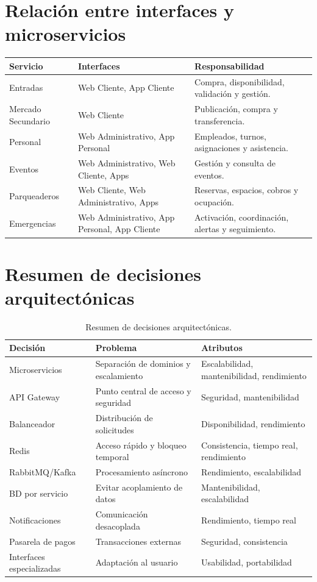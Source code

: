 \documentclass[12pt,a4paper]{article}
\begin{document}
\section{Relación entre interfaces y microservicios}

\begin{longtable}{p{4cm}p{4cm}p{6cm}}
\toprule
\textbf{Servicio} & \textbf{Interfaces} & \textbf{Responsabilidad}\\
\midrule
Entradas & Web Cliente, App Cliente & Compra, disponibilidad, validación y gestión.\\
Mercado Secundario & Web Cliente & Publicación, compra y transferencia.\\
Personal & Web Administrativo, App Personal & Empleados, turnos, asignaciones y asistencia.\\
Eventos & Web Administrativo, Web Cliente, Apps & Gestión y consulta de eventos.\\
Parqueaderos & Web Cliente, Web Administrativo, Apps & Reservas, espacios, cobros y ocupación.\\
Emergencias & Web Administrativo, App Personal, App Cliente & Activación, coordinación, alertas y seguimiento.\\
\bottomrule
\end{longtable}

\section{Resumen de decisiones arquitectónicas}

\begin{table}[H]
\centering
\small
\begin{tabular}{p{4cm}p{5cm}p{5cm}}
\toprule
\textbf{Decisión} & \textbf{Problema} & \textbf{Atributos}\\
\midrule
Microservicios & Separación de dominios y escalamiento & Escalabilidad, mantenibilidad, rendimiento\\
API Gateway & Punto central de acceso y seguridad & Seguridad, mantenibilidad\\
Balanceador & Distribución de solicitudes & Disponibilidad, rendimiento\\
Redis & Acceso rápido y bloqueo temporal & Consistencia, tiempo real, rendimiento\\
RabbitMQ/Kafka & Procesamiento asíncrono & Rendimiento, escalabilidad\\
BD por servicio & Evitar acoplamiento de datos & Mantenibilidad, escalabilidad\\
Notificaciones & Comunicación desacoplada & Rendimiento, tiempo real\\
Pasarela de pagos & Transacciones externas & Seguridad, consistencia\\
Interfaces especializadas & Adaptación al usuario & Usabilidad, portabilidad\\
\bottomrule
\end{tabular}
\caption{Resumen de decisiones arquitectónicas.}
\end{table}
\end{document}
